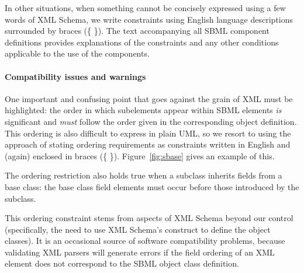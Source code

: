 \begin{blockChanged}
In other situations, when something cannot be concisely expressed
using a few words of XML Schema, we write constraints using
English language descriptions surrounded by braces
(\{ \}).  The text accompanying all SBML component
definitions provides explanations of the constraints and any other
conditions applicable to the use of the components.


\paragraph{Compatibility issues and warnings}

One important and confusing point that goes against the grain of
XML must be highlighted: the order in which subelements appear
within SBML elements \emph{is} significant and \emph{must} follow
the order given in the corresponding object definition.  This
ordering is also difficult to express in plain UML, so we resort
to using the approach of stating ordering requirements as
constraints written in English and (again) enclosed in
braces (\{ \}).  Figure~\vref{fig:sbase} gives an example of this.

The ordering restriction also holds true when a subclass inherits
fields from a base class: the base class field elements must occur
before those introduced by the subclass.

This ordering constraint stems from aspects of XML Schema beyond
our control (specifically, the need to use XML Schema's
 construct to define the object classes).  It is
an occasional source of software compatibility problems, because
validating XML parsers will generate errors if the field ordering
of an XML element does not correspond to the SBML object class
definition.


\end{blockChanged}
